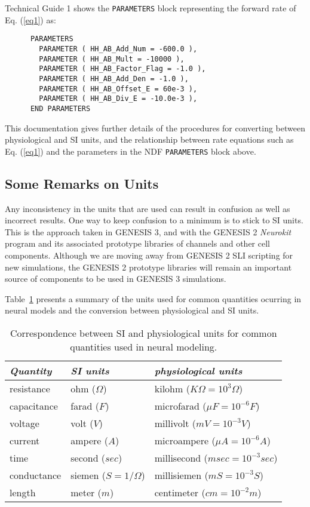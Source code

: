 \documentclass[12pt]{article}
\begin{document}
Technical Guide 1 shows the {\tt PARAMETERS} block representing the forward
rate of Eq. (\ref{eq1}) as:

\begin{verbatim}
      PARAMETERS
        PARAMETER ( HH_AB_Add_Num = -600.0 ),
        PARAMETER ( HH_AB_Mult = -10000 ),
        PARAMETER ( HH_AB_Factor_Flag = -1.0 ),
        PARAMETER ( HH_AB_Add_Den = -1.0 ),
        PARAMETER ( HH_AB_Offset_E = 60e-3 ),
        PARAMETER ( HH_AB_Div_E = -10.0e-3 ),
      END PARAMETERS
\end{verbatim}

This documentation gives further details of the procedures for converting
between physiological and SI units, and the relationship between rate equations
such as Eq. (\ref{eq1}) and the parameters in the NDF {\tt PARAMETERS}
block above.

\subsection{Some Remarks on Units}

Any inconsistency in the units that are used can result in confusion as
well as incorrect results.  One way to keep confusion to a minimum is to
stick to SI units.  This is the approach taken in GENESIS 3, and with the GENESIS 2
{\em Neurokit\/} program and its associated prototype libraries of channels
and other cell components.  Although we are moving away from GENESIS 2
SLI scripting for new simulations, the GENESIS 2 prototype libraries will
remain an important source of components to be used in GENESIS 3
simulations.

Table~\ref{tab1} presents a summary of
the units used for common quantities ocurring in neural models and
the conversion between physiological and SI units.

\begin{table}[thb]
\label{tab1}
\centering
\begin{tabular}{lll} \hline
{\em Quantity}   & {\em SI units}       & {\em physiological units} \\
\hline
  resistance   & ohm ($\Omega$)  & kilohm ($K\Omega = 10^3 \Omega$) \\
  capacitance  & farad ($F$)     & microfarad ($\mu F = 10^{-6} F$) \\
  voltage      & volt ($V$)      & millivolt ($mV = 10^{-3} V$) \\
  current      & ampere ($A$)    & microampere ($\mu A = 10^{-6} A$) \\
  time         & second ($sec$)  & millisecond ($msec = 10^{-3} sec$) \\
  conductance & siemen ($S = 1/\Omega$) & millisiemen ($mS = 10^{-3} S$) \\
  length       & meter ($m$)     & centimeter ($cm = 10^{-2} m$) \\
\hline
\end{tabular}
\caption{Correspondence between SI and physiological units for common
quantities used in neural modeling.}
\end{table}
\end{document}
